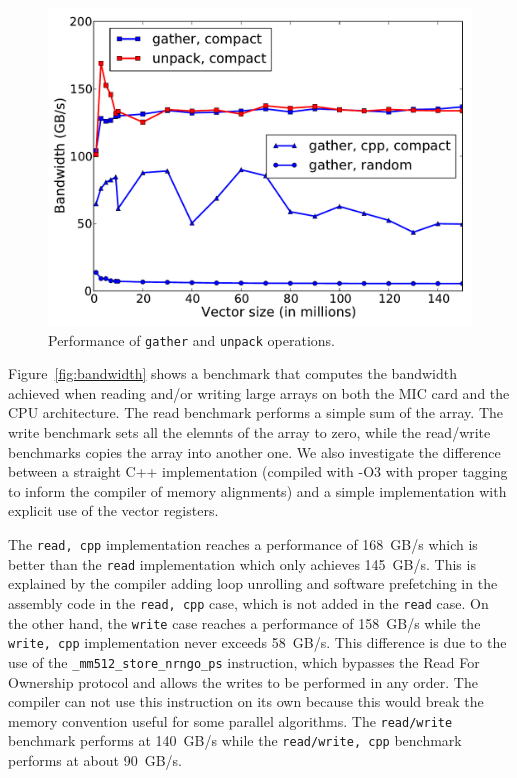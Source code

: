 \documentclass[10pt,conference,compsocconf]{IEEEtran}
\begin{document}
\begin{figure}[t]
  \centering
  \includegraphics[width=.9\linewidth]{figures/bandwidth_gather_unpack.pdf}
  \caption{Performance of {\tt gather} and {\tt unpack} operations.}
  \label{fig:band_gather} 
\end{figure}


Figure~\ref{fig:bandwidth} shows a benchmark that computes the
bandwidth achieved when reading and/or writing large arrays on both
the MIC card and the CPU architecture. The read benchmark performs a
simple sum of the array. The write benchmark sets all the elemnts of
the array to zero, while the read/write benchmarks copies the array into
another one. We also investigate the difference between a straight C++
implementation (compiled with \mbox{-O3} with proper tagging to inform the
compiler of memory alignments) and a simple implementation with
explicit use of the vector registers.

The {\tt read, cpp} implementation reaches a performance of 168~GB/s
 which is better than the {\tt read}
implementation which only achieves 145~GB/s. This
is explained by the compiler adding loop unrolling and software
prefetching in the assembly code in the {\tt read, cpp} case, which is
not added in the {\tt read} case. On the other hand, the {\tt write}
case reaches a performance of 158~GB/s while the
{\tt write, cpp} implementation never exceeds 58~GB/s. 
This difference is due to the use of the {\tt \_mm512\_store\_nrngo\_ps} instruction, 
which bypasses the Read For Ownership protocol and allows the writes
to be performed in any order. The compiler can not use this
instruction on its own because this would break the memory convention
useful for some parallel algorithms. The {\tt read/write} benchmark
performs at 140~GB/s while the {\tt read/write, cpp} benchmark performs
at about 90~GB/s.
\end{document}
